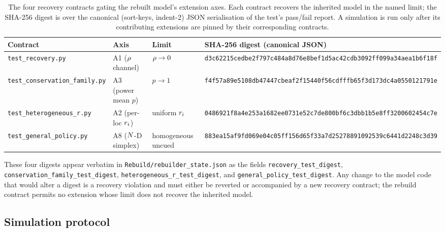 \begin{table}[tb]
  \centering
  \small
  \begin{tabular}{@{}lllp{6.5cm}@{}}
    \toprule
    Contract & Axis & Limit & SHA-256 digest (canonical JSON) \\
    \midrule
    \texttt{test\_recovery.py}
      & A1 ($\rho$ channel)
      & $\rho \to 0$
      & \texttt{d3c62215cedbe2f797c484a8d76e8bef1d5ac42cdb3092ff099a34aea1b6f18f} \\
    \texttt{test\_conservation\_family.py}
      & A3 (power mean $p$)
      & $p \to 1$
      & \texttt{f4f57a89e5108db47447cbeaf2f15440f56cdfffb65f3d173dc4a0550121791e} \\
    \texttt{test\_heterogeneous\_r.py}
      & A2 (per-loc $r_i$)
      & uniform $r_i$
      & \texttt{0486921f8a4e253a1682ee0731e52c7de800bf6c3dbb1b5e8ff3200602454c7e} \\
    \texttt{test\_general\_policy.py}
      & A8 ($N$-D simplex)
      & homogeneous uncued
      & \texttt{883ea15af9fd069e04c05ff156d65f33a7d25278891092539c6441d2248c3d39} \\
    \bottomrule
  \end{tabular}
  \caption[Recovery contracts]{The four recovery contracts gating the
    rebuilt model's extension axes.  Each contract recovers the
    inherited model in the named limit; the SHA-256 digest is over
    the canonical (sort-keys, indent-$2$) JSON serialisation of the
    test's pass/fail report.  A simulation is run only after its
    contributing extensions are pinned by their corresponding
    contracts.}
  \label{tab:methods-recovery}
\end{table}

These four digests appear verbatim in
\texttt{Rebuild/rebuilder\_state.json} as the fields
\texttt{recovery\_test\_digest},
\texttt{conservation\_family\_test\_digest},
\texttt{heterogeneous\_r\_test\_digest}, and
\texttt{general\_policy\_test\_digest}.  Any change to the model code
that would alter a digest is a recovery violation and must either be
reverted or accompanied by a new recovery contract; the rebuild
contract permits no extension whose limit does not recover the
inherited model.

\subsection{Simulation protocol}
\label{sec:methods-sims}

